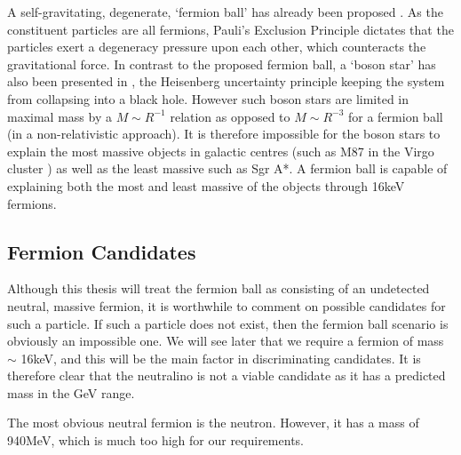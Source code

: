 A self-gravitating, degenerate, `fermion ball' has already been proposed
\cite{ref_fermion1, ref_fermion2, ref_fermion3, ref_thomasfermiapproach, ref_bilic, ref_classicalapproach}.
As the constituent particles are all fermions, Pauli's Exclusion
Principle dictates that the particles exert a degeneracy pressure upon each other, which counteracts the gravitational force.
In contrast to the proposed fermion ball, a `boson star' has also been presented in \cite{ref_bosonstar}, the Heisenberg
uncertainty principle keeping the system from collapsing into a black hole.
However such boson stars are limited in maximal mass by a $M \sim R^{-1}$ relation as opposed to $M \sim R^{-3}$ for a fermion ball (in a
non-relativistic approach). It is therefore impossible for the boson stars to explain the most massive objects in galactic centres (such
as M87 in the Virgo cluster \cite{ref_centralobjects}) as well as the least massive such as Sgr A*. A fermion ball is capable of
explaining both the most and least massive of the objects through 16keV fermions.

\subsection{Fermion Candidates}
Although this thesis will treat the fermion ball as consisting of an undetected neutral, massive fermion, it is worthwhile to comment
on possible candidates for such a particle. If such a particle does not exist, then the fermion ball scenario is obviously an impossible one.
We will see later that we require a fermion of mass $\sim$ 16keV, and this will be the main factor in discriminating candidates. It is
therefore clear that the neutralino is not a viable candidate as it has a predicted mass in the GeV range.

The most obvious neutral fermion is the neutron. However, it has a mass of 940MeV, which is much too high for our requirements.

